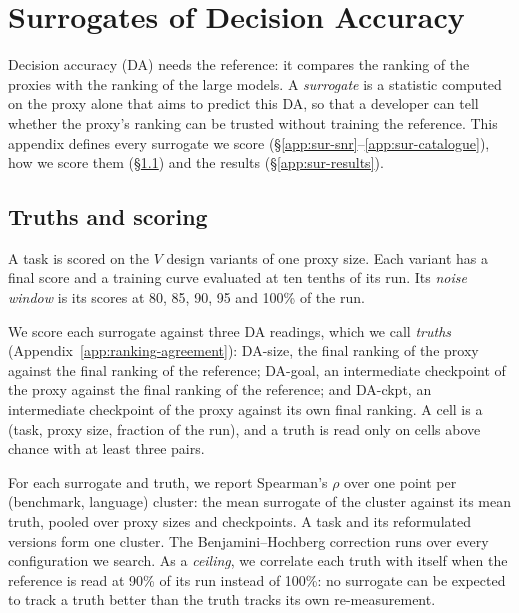 
\clearpage

\section{Surrogates of Decision Accuracy}
\label{app:surrogates}
\label{subsec:methodology-snr}

Decision accuracy (DA) needs the reference: it compares the ranking of the proxies with the ranking of the large models. A \emph{surrogate} is a statistic computed on the proxy alone that aims to predict this DA, so that a developer can tell whether the proxy's ranking can be trusted without training the reference. This appendix defines every surrogate we score (\S\ref{app:sur-snr}--\ref{app:sur-catalogue}), how we score them (\S\ref{app:sur-scoring}) and the results (\S\ref{app:sur-results}).

\subsection{Truths and scoring}
\label{app:sur-scoring}
\label{app:sur-notation}

A task is scored on the $V$ design variants of one proxy size. Each variant has a final score and a training curve evaluated at ten tenths of its run. Its \emph{noise window} is its scores at 80, 85, 90, 95 and 100\% of the run.

We score each surrogate against three DA readings, which we call \emph{truths} (Appendix~\ref{app:ranking-agreement}): DA-size, the final ranking of the proxy against the final ranking of the reference; DA-goal, an intermediate checkpoint of the proxy against the final ranking of the reference; and DA-ckpt, an intermediate checkpoint of the proxy against its own final ranking. A cell is a (task, proxy size, fraction of the run), and a truth is read only on cells above chance with at least three pairs.

For each surrogate and truth, we report Spearman's $\rho$ over one point per (benchmark, language) cluster: the mean surrogate of the cluster against its mean truth, pooled over proxy sizes and checkpoints. A task and its reformulated versions form one cluster. The Benjamini--Hochberg correction runs over every configuration we search. As a \emph{ceiling}, we correlate each truth with itself when the reference is read at 90\% of its run instead of 100\%: no surrogate can be expected to track a truth better than the truth tracks its own re-measurement.

